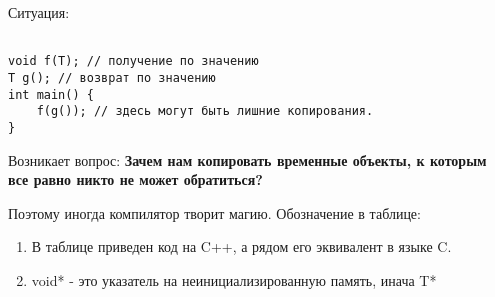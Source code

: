\documentclass[12pt]{article}
\begin{document}
Ситуация:
\begin{verbatim}

void f(T); // получение по значению
T g(); // возврат по значению
int main() {
    f(g()); // здесь могут быть лишние копирования.
}
\end{verbatim}


Возникает вопрос: \textbf{Зачем нам копировать временные объекты, к которым все равно никто не может обратиться?}


Поэтому иногда компилятор творит магию. Обозначение в таблице:
\begin{enumerate}
    \item В таблице приведен код на C++, а рядом его эквивалент в языке C.
    \item  void* - это указатель на неинициализированную память, инача T*
\end{enumerate}
\end{document}
